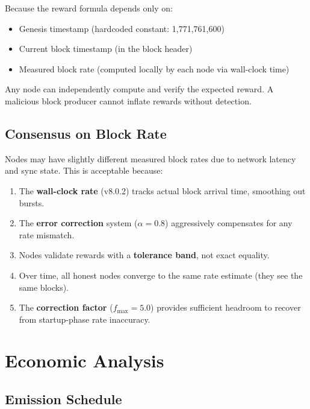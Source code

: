 \documentclass[11pt,a4paper]{article}
\begin{document}
\begin{tcolorbox}[colback=green!5,colframe=quggreen,title=\textbf{Key Insight: No Trust Required}]
Because the reward formula depends only on:
\begin{itemize}
    \item Genesis timestamp (hardcoded constant: 1,771,761,600)
    \item Current block timestamp (in the block header)
    \item Measured block rate (computed locally by each node via wall-clock time)
\end{itemize}
Any node can independently compute and verify the expected reward. A malicious block producer cannot inflate rewards without detection.
\end{tcolorbox}

\subsection{Consensus on Block Rate}

Nodes may have slightly different measured block rates due to network latency and sync state. This is acceptable because:

\begin{enumerate}
    \item The \textbf{wall-clock rate} (v8.0.2) tracks actual block arrival time, smoothing out bursts.
    \item The \textbf{error correction} system ($\alpha = 0.8$) aggressively compensates for any rate mismatch.
    \item Nodes validate rewards with a \textbf{tolerance band}, not exact equality.
    \item Over time, all honest nodes converge to the same rate estimate (they see the same blocks).
    \item The \textbf{correction factor} ($f_{\max} = 5.0$) provides sufficient headroom to recover from startup-phase rate inaccuracy.
\end{enumerate}

\section{Economic Analysis}
\label{sec:economics}

\subsection{Emission Schedule}
\end{document}
